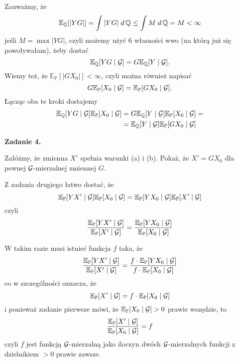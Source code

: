 \documentclass{article}
\newcommand{\E}{\mathbb{E}}
\renewcommand{\P}{\mathbb{P}}
\begin{document}
Zauważmy, że
$$\E_{\Q}[|YG|]=\int|YG|\;d\Q\leq \int M\;d\Q=M<\infty$$
jeśli $M=\max|YG|$, czyli możemy użyć 6 własności wwo (na którą już się powoływałam), żeby dostać
$$\E_{\Q}[YG\;|\;\set{G}]=G\E_{\Q}[Y\;|\;\set{G}].$$
Wiemy też, że $\E_{\P}[|GX_0|]<\infty$, czyli można również napisać
$$G\E_{\P}[X_0\;|\;\set{G}]=\E_{\P}[GX_0\;|\;\set{G}].$$
Łącząc oba te kroki dostajemy
\begin{align*}
  \E_{\Q}[YG\;|\;\set{G}]\E_{\P}[X_0\;|\;\set{G}]&=G\E_{\Q}[Y\;|\;\set{G}]\E_{\P}[X_0\;|\;\set{G}]=\\
      &=\E_{\Q}[Y\;|\;\set{G}]\E_{\P}[GX_0\;|\;\set{G}]
\end{align*}
\bigskip

{\bfseries{\large\color{orange}Zadanie 4.}
  
  Załóżmy, że zmienna $X'$ spełnia warunki (a) i (b). Pokaż, że $X'=GX_0$ dla pewnej $\mathcal{G}$-mierzalnej zmiennej $G$.
}
\medskip

%
%



Z zadania drugiego łatwo dostać, że
$$\E_{\P}[YX'\;|\;\set{G}]\E_{\P}[X_0\;|\;\set{G}]=\E_{\P}[YX_0\;|\;\set{G}]\E_{\P}[X'\;|\;\set{G}]$$
czyli
$$\frac{\E_{\P}[YX'\;|\;\set{G}]}{\E_{\P}[X'\;|\;\set{G}]}=\frac{\E_{\P}[YX_0\;|\;\set{G}]}{\E_{\P}[X_0\;|\;\set{G}]}$$

W takim razie musi istnieć funkcja $f$ taka, że
$$\frac{\E_{\P}[YX'\;|\;\set{G}]}{\E_{\P}[X'\;|\;\set{G}]}=\frac{f\cdot\E_{\P}[YX_0\;|\;\set{G}]}{f\cdot\E_{\P}[X_0\;|\;\set{G}]}$$
co w szczególności oznacza, że
$$\E_{\P}[X'\;|\;\set{G}]=f\cdot\E_{\P}[X_0\;|\;\set{G}]$$
i ponieważ zadanie pierwsze mówi, że $\E_{\P}[X_0\;|\;\set{G}]>0$ prawie wszędzie, to
$$\frac{\E_{\P}[X'\;|\;\set{G}]}{\E_{\P}[X_0\;|\;\set{G}]}=f$$
czyli $f$ jest funkcją $\mathcal{G}$-mierzalną jako iloczyn dwóch $\mathcal{G}$-mierzalnych funkcji z dzielnikiem $>0$ prawie zawsze.
\end{document}
